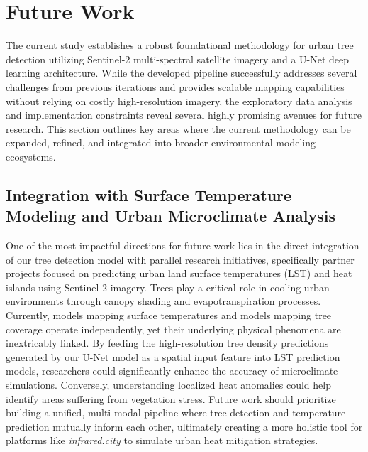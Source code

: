 \section{Future Work}

The current study establishes a robust foundational methodology for urban tree detection utilizing Sentinel-2 multi-spectral satellite imagery and a U-Net deep learning architecture. While the developed pipeline successfully addresses several challenges from previous iterations and provides scalable mapping capabilities without relying on costly high-resolution imagery, the exploratory data analysis and implementation constraints reveal several highly promising avenues for future research. This section outlines key areas where the current methodology can be expanded, refined, and integrated into broader environmental modeling ecosystems.

\subsection{Integration with Surface Temperature Modeling and Urban Microclimate Analysis}
One of the most impactful directions for future work lies in the direct integration of our tree detection model with parallel research initiatives, specifically partner projects focused on predicting urban land surface temperatures (LST) and heat islands using Sentinel-2 imagery. Trees play a critical role in cooling urban environments through canopy shading and evapotranspiration processes. Currently, models mapping surface temperatures and models mapping tree coverage operate independently, yet their underlying physical phenomena are inextricably linked. By feeding the high-resolution tree density predictions generated by our U-Net model as a spatial input feature into LST prediction models, researchers could significantly enhance the accuracy of microclimate simulations. Conversely, understanding localized heat anomalies could help identify areas suffering from vegetation stress. Future work should prioritize building a unified, multi-modal pipeline where tree detection and temperature prediction mutually inform each other, ultimately creating a more holistic tool for platforms like \textit{infrared.city} to simulate urban heat mitigation strategies.

